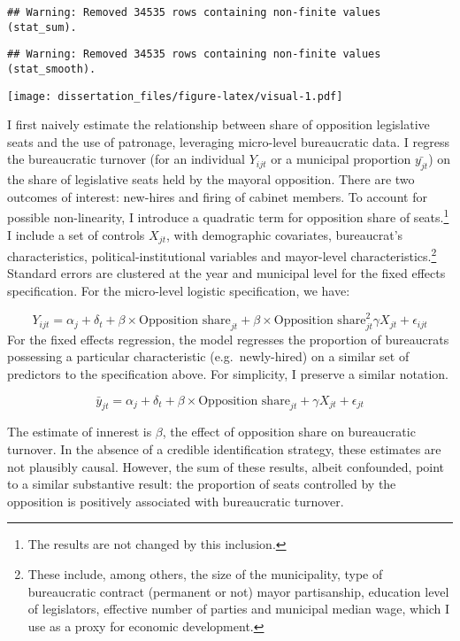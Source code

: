 \documentclass[12pt,]{book}
\let\rmarkdownfootnote\footnote%
\def\footnote{\protect\rmarkdownfootnote}
\begin{document}
\begin{verbatim}
## Warning: Removed 34535 rows containing non-finite values (stat_sum).
\end{verbatim}

\begin{verbatim}
## Warning: Removed 34535 rows containing non-finite values (stat_smooth).
\end{verbatim}

\texttt{[image: dissertation\_files/figure-latex/visual-1.pdf]}

I first naively estimate the relationship between share of opposition legislative seats and the use of patronage, leveraging micro-level bureaucratic data. I regress the bureaucratic turnover (for an individual \(Y_{ijt}\) or a municipal proportion \(\bar{y_{jt}}\)) on the share of legislative seats held by the mayoral opposition. There are two outcomes of interest: new-hires and firing of cabinet members. To account for possible non-linearity, I introduce a quadratic term for opposition share of seats.\footnote{The results are not changed by this inclusion.} I include a set of controls \(X_{jt}\), with demographic covariates, bureaucrat's characteristics, political-institutional variables and mayor-level characteristics.\footnote{These include, among others, the size of the municipality, type of bureaucratic contract (permanent or not) mayor partisanship, education level of legislators, effective number of parties and municipal median wage, which I use as a proxy for economic development.} Standard errors are clustered at the year and municipal level for the fixed effects specification. For the micro-level logistic specification, we have:

\[Y_{ijt} = \alpha_j + \delta_t + \beta\times\text{Opposition share}_{jt} + \beta\times\text{Opposition share}^2_{jt} \gamma X_{jt} + \epsilon_{ijt}\]
For the fixed effects regression, the model regresses the proportion of bureaucrats possessing a particular characteristic (e.g.~newly-hired) on a similar set of predictors to the specification above. For simplicity, I preserve a similar notation.

\[\bar{y}_{jt} = \alpha_j + \delta_t + \beta\times\text{Opposition share}_{jt} + \gamma X_{jt} + \epsilon_{jt}\]

The estimate of innerest is \(\beta\), the effect of opposition share on bureaucratic turnover. In the absence of a credible identification strategy, these estimates are not plausibly causal. However, the sum of these results, albeit confounded, point to a similar substantive result: the proportion of seats controlled by the opposition is positively associated with bureaucratic turnover.
\end{document}
